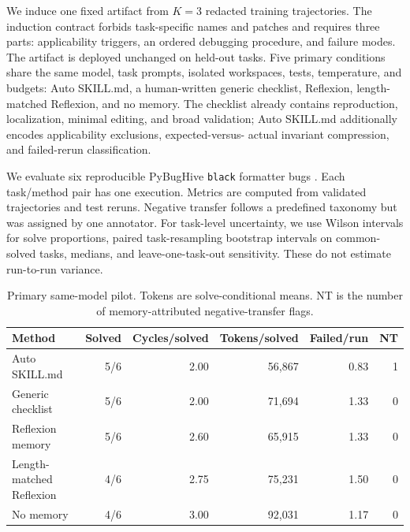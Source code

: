 \documentclass[sigconf,screen,pbalance]{acmart}
\begin{document}
We induce one fixed artifact from $K=3$ redacted training trajectories. The
induction contract forbids task-specific names and patches and requires three
parts: applicability triggers, an ordered debugging procedure, and failure
modes. The artifact is deployed unchanged on held-out tasks. Five primary
conditions share the same model, task prompts, isolated workspaces, tests,
temperature, and budgets: Auto SKILL.md, a human-written generic checklist,
Reflexion, length-matched Reflexion, and no memory. The checklist already
contains reproduction, localization, minimal editing, and broad validation;
Auto SKILL.md additionally encodes applicability exclusions, expected-versus-
actual invariant compression, and failed-rerun classification.

We evaluate six reproducible PyBugHive \texttt{black} formatter bugs
\cite{antal2024pybughive}. Each task/method pair has one execution. Metrics are
computed from validated trajectories and test reruns. Negative transfer follows
a predefined taxonomy but was assigned by one annotator. For task-level
uncertainty, we use Wilson intervals for solve proportions, paired
task-resampling bootstrap intervals on common-solved tasks, medians, and
leave-one-task-out sensitivity. These do not estimate run-to-run variance.

\begin{table}[t]
\centering
\caption{Primary same-model pilot. Tokens are solve-conditional means. NT is
the number of memory-attributed negative-transfer flags.}
\label{tab:poster_primary}
\begin{tabular}{lrrrr@{\hspace{1.2em}}r}
\toprule
Method & Solved & Cycles/solved & Tokens/solved & Failed/run & NT \\
\midrule
Auto SKILL.md & 5/6 & 2.00 & 56,867 & 0.83 & 1 \\
Generic checklist & 5/6 & 2.00 & 71,694 & 1.33 & 0 \\
Reflexion memory & 5/6 & 2.60 & 65,915 & 1.33 & 0 \\
Length-matched Reflexion & 4/6 & 2.75 & 75,231 & 1.50 & 0 \\
No memory & 4/6 & 3.00 & 92,031 & 1.17 & 0 \\
\bottomrule
\end{tabular}
\end{table}
\end{document}
